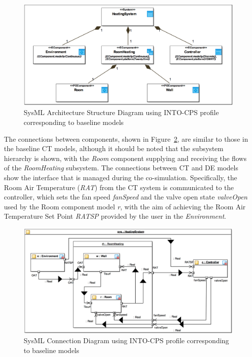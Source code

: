 \begin{figure}[htb!]
\begin{center}
     \includegraphics[width=0.75\linewidth]{fcu/fcu_sysml_asd}
\caption{SysML Architecture Structure Diagram using INTO-CPS profile corresponding to baseline models}
\label{fig:fcu_sysml_asd}
\end{center}
\end{figure}

The connections between components, shown in Figure~\ref{fig:fcu_sysml_cd}, are similar to those in the baseline CT models, although it should be noted that the subsystem hierarchy is shown, with the \emph{Room} component supplying and receiving the flows of the \emph{RoomHeating} subsystem.
The connections between CT and DE models show the interface that is managed during the co-simulation. Specifically, the Room Air Temperature (\emph{RAT}) from the CT system is communicated to the controller, which sets the fan speed \emph{fanSpeed} and the valve open state \emph{valveOpen} used by the Room component model \emph{r}, with the aim of achieving the Room Air Temperature Set Point \emph{RATSP} provided by the user in the \emph{Environment}. 

\begin{figure}[htb!]
\begin{center}
     \includegraphics[width=0.7\linewidth]{fcu/fcu_sysml_cd}
\caption{SysML Connection Diagram using INTO-CPS profile corresponding to baseline models}
\label{fig:fcu_sysml_cd}
\end{center}
\end{figure}

